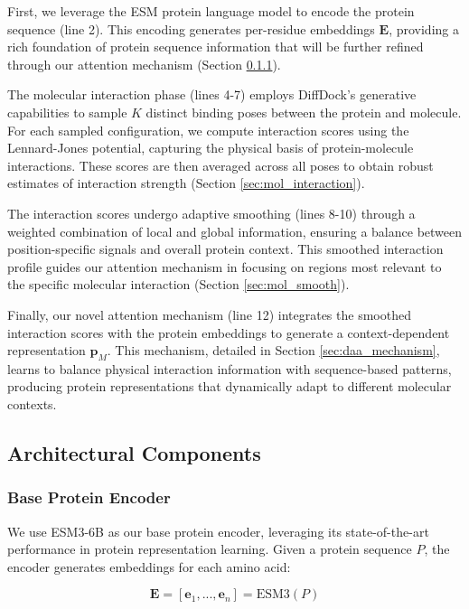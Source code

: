 \documentclass[sigconf]{acmart}
\begin{document}
First, we leverage the ESM protein language model to encode the protein sequence (line 2). This encoding generates per-residue embeddings $\mathbf{E}$, providing a rich foundation of protein sequence information that will be further refined through our attention mechanism (Section \ref{sec:base_encoder}).

The molecular interaction phase (lines 4-7) employs DiffDock's generative capabilities to sample $K$ distinct binding poses between the protein and molecule. For each sampled configuration, we compute interaction scores using the Lennard-Jones potential, capturing the physical basis of protein-molecule interactions. These scores are then averaged across all poses to obtain robust estimates of interaction strength (Section \ref{sec:mol_interaction}).

The interaction scores undergo adaptive smoothing (lines 8-10) through a weighted combination of local and global information, ensuring a balance between position-specific signals and overall protein context. This smoothed interaction profile guides our attention mechanism in focusing on regions most relevant to the specific molecular interaction (Section \ref{sec:mol_smooth}).

Finally, our novel attention mechanism (line 12) integrates the smoothed interaction scores with the protein embeddings to generate a context-dependent representation $\mathbf{p}_M$. This mechanism, detailed in Section \ref{sec:daa_mechanism}, learns to balance physical interaction information with sequence-based patterns, producing protein representations that dynamically adapt to different molecular contexts.


\subsection{Architectural Components}

\subsubsection{Base Protein Encoder}
\label{sec:base_encoder}
We use ESM3-6B as our base protein encoder, leveraging its state-of-the-art performance in protein representation learning. Given a protein sequence $P$, the encoder generates embeddings for each amino acid:

\begin{equation}
    \mathbf{E} = [\mathbf{e}_1, ..., \mathbf{e}_n] = \text{ESM3}(P)
\end{equation}
\end{document}
